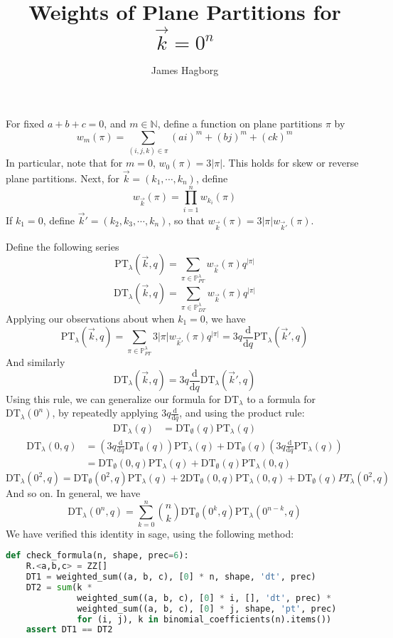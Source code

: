 \documentclass{amsart}
\title{Weights of Plane Partitions for $\vec{k} = 0^n$}
\author{James Hagborg}
\newcommand{\dd}[1]{\frac{\mathrm{d}}{\mathrm{d}#1}}
\newcommand{\PT}{\mathrm{PT}}
\newcommand{\DT}{\mathrm{DT}}
\newcommand{\PPT}[1]{\mathbb{P}^{#1}_{PT}}
\newcommand{\PDT}[1]{\mathbb{P}^{#1}_{DT}}
\newcommand{\NN}{\mathbb{N}}
\begin{document}
\maketitle
For fixed $a + b + c = 0$, and $m \in \NN$, define a function on plane
partitions $\pi$ by
\[
  w_m(\pi) = \sum_{(i, j, k) \in \pi} (ai)^m + (bj)^m + (ck)^m
\]
In particular, note that for $m = 0$, $w_0(\pi) = 3|\pi|$.  This holds
for skew or reverse plane partitions.  Next, for
$\vec{k} = (k_1, \cdots, k_n)$, define
\[
  w_{\vec k}(\pi) = \prod_{i=1}^n w_{k_i}(\pi)
\]
If $k_1 = 0$, define $\vec k' = (k_2, k_3, \cdots, k_n)$, so that
$w_{\vec k}(\pi) = 3|\pi|w_{\vec k'}(\pi)$.

Define the following series
\[
  \PT_\lambda(\vec k,q) = \sum_{\pi\in\PPT\lambda} w_{\vec k}(\pi)q^{|\pi|}
\]
\[
  \DT_\lambda(\vec k,q) = \sum_{\pi\in\PDT\lambda} w_{\vec k}(\pi)q^{|\pi|}
\]
Applying our observations about when $k_1 = 0$, we have
\[
  \PT_\lambda(\vec k, q)
  = \sum_{\pi\in\PPT\lambda} 3|\pi|w_{\vec k'}(\pi)q^{|\pi|}
  = 3q\dd{q} \PT_\lambda(\vec k', q)
\]
And similarly
\[
  \DT_\lambda(\vec k, q) = 3q\dd{q} \DT_\lambda(\vec k', q)
\]
Using this rule, we can generalize our formula for $\DT_\lambda$ to a
formula for $\DT_\lambda(0^n)$, by repeatedly applying $3q\dd{q}$, and
using the product rule:
\begin{align*}
  \DT_\lambda(q)
  &= \DT_\emptyset(q)\PT_\lambda(q)
\end{align*}
\begin{align*}
  \DT_\lambda(0, q)
  &= \left(3q\dd{q}\DT_\emptyset(q)\right)\PT_\lambda(q) +
    \DT_\emptyset(q)\left(3q\dd{q}\PT_\lambda(q)\right) \\
  &= \DT_\emptyset(0, q)\PT_\lambda(q) +
    \DT_\emptyset(q)\PT_\lambda(0, q)
\end{align*}
\[
  \DT_\lambda(0^2, q) =
  \DT_\emptyset(0^2, q)\PT_\lambda(q) +
  2\DT_\emptyset(0, q)\PT_\lambda(0, q) +
  \DT_\emptyset(q)PT_\lambda(0^2, q)
\]
And so on.  In general, we have
\[
  \DT_\lambda(0^n, q) =
  \sum_{k = 0}^n \binom{n}{k}
  \DT_\emptyset(0^k, q)\PT_\lambda(0^{n-k}, q)
\]
We have verified this identity in sage, using the following method:
\begin{lstlisting}[language=python]
def check_formula(n, shape, prec=6):
    R.<a,b,c> = ZZ[]
    DT1 = weighted_sum((a, b, c), [0] * n, shape, 'dt', prec)
    DT2 = sum(k *
              weighted_sum((a, b, c), [0] * i, [], 'dt', prec) *
              weighted_sum((a, b, c), [0] * j, shape, 'pt', prec)
              for (i, j), k in binomial_coefficients(n).items())
    assert DT1 == DT2
\end{lstlisting}
\end{document}

